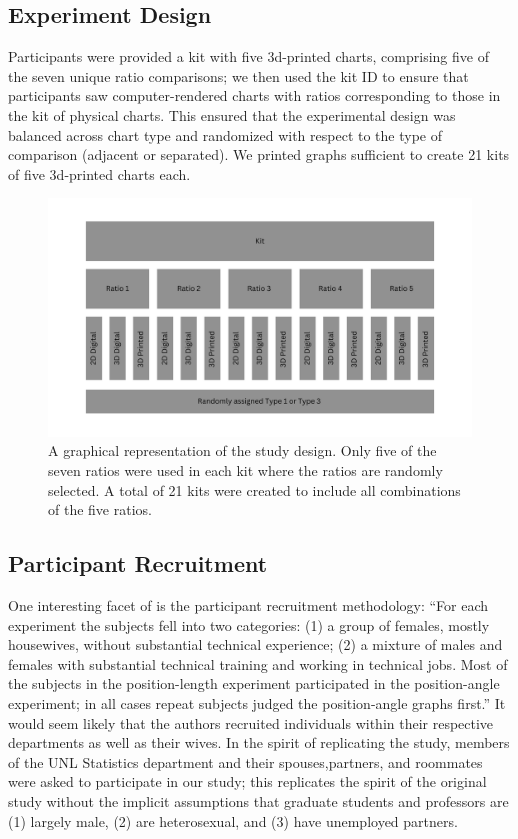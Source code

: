 \documentclass[letterpaper,inpress,dvipsnames]{jdsart}
\begin{document}
\hypertarget{experiment-design}{%
\subsection{Experiment Design}\label{experiment-design}}

Participants were provided a kit with five 3d-printed charts, comprising five of the seven unique ratio comparisons; we then used the kit ID to ensure that participants saw computer-rendered charts with ratios corresponding to those in the kit of physical charts.
This ensured that the experimental design was balanced across chart type and randomized with respect to the type of comparison (adjacent or separated).
We printed graphs sufficient to create 21 kits of five 3d-printed charts each.

\begin{figure}
\includegraphics[width=6.4in]{study-design} \caption{A graphical representation of the study design. Only five of the seven ratios were used in each kit where the ratios are randomly selected. A total of 21 kits were created to include all combinations of the five ratios.}\label{fig:studyDesign}
\end{figure}

\hypertarget{participant-recruitment}{%
\subsection{Participant Recruitment}\label{participant-recruitment}}

One interesting facet of \citet{cleveland_graphical_1984} is the participant recruitment methodology: ``For each experiment the subjects fell into two categories: (1) a group of females, mostly housewives, without substantial technical experience; (2) a mixture of males and females with substantial technical training and working in technical jobs. Most of the subjects in the position-length experiment participated in the position-angle experiment; in all cases repeat subjects judged the position-angle graphs first.'' It would seem likely that the authors recruited individuals within their respective departments as well as their wives.
In the spirit of replicating the study, members of the UNL Statistics department and their spouses,partners, and roommates were asked to participate in our study; this replicates the spirit of the original study without the implicit assumptions that graduate students and professors are (1) largely male, (2) are heterosexual, and (3) have unemployed partners.
\end{document}
